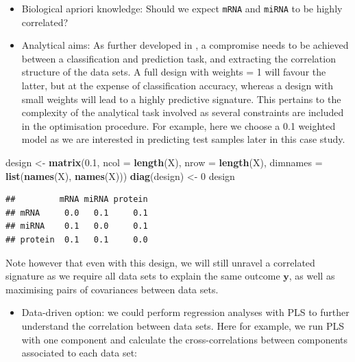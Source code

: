 \documentclass[]{book}
\newenvironment{Shaded}{\begin{snugshade}}{\end{snugshade}}
\newcommand{\DataTypeTok}[1]{\textcolor[rgb]{0.13,0.29,0.53}{#1}}
\newcommand{\DecValTok}[1]{\textcolor[rgb]{0.00,0.00,0.81}{#1}}
\newcommand{\FloatTok}[1]{\textcolor[rgb]{0.00,0.00,0.81}{#1}}
\newcommand{\KeywordTok}[1]{\textcolor[rgb]{0.13,0.29,0.53}{\textbf{#1}}}
\newcommand{\NormalTok}[1]{#1}
\newcommand{\StringTok}[1]{\textcolor[rgb]{0.31,0.60,0.02}{#1}}
\providecommand{\tightlist}{%
  \setlength{\itemsep}{0pt}\setlength{\parskip}{0pt}}
\begin{document}
\begin{itemize}
\item
  Biological apriori knowledge: Should we expect \texttt{mRNA} and \texttt{miRNA} to be highly correlated?
\item
  Analytical aims: As further developed in \citet{Sin19}, a compromise needs to be achieved between a classification and prediction task, and extracting the correlation structure of the data sets. A full design with weights = 1 will favour the latter, but at the expense of classification accuracy, whereas a design with small weights will lead to a highly predictive signature. This pertains to the complexity of the analytical task involved as several constraints are included in the optimisation procedure. For example, here we choose a 0.1 weighted model as we are interested in predicting test samples later in this case study.
\end{itemize}

\begin{Shaded}
\begin{Highlighting}[]
\NormalTok{design <-}\StringTok{ }\KeywordTok{matrix}\NormalTok{(}\FloatTok{0.1}\NormalTok{, }\DataTypeTok{ncol =} \KeywordTok{length}\NormalTok{(X), }\DataTypeTok{nrow =} \KeywordTok{length}\NormalTok{(X), }
                \DataTypeTok{dimnames =} \KeywordTok{list}\NormalTok{(}\KeywordTok{names}\NormalTok{(X), }\KeywordTok{names}\NormalTok{(X)))}
\KeywordTok{diag}\NormalTok{(design) <-}\StringTok{ }\DecValTok{0}
\NormalTok{design }
\end{Highlighting}
\end{Shaded}

\begin{verbatim}
##         mRNA miRNA protein
## mRNA     0.0   0.1     0.1
## miRNA    0.1   0.0     0.1
## protein  0.1   0.1     0.0
\end{verbatim}

Note however that even with this design, we will still unravel a correlated signature as we require all data sets to explain the same outcome \(\boldsymbol y\), as well as maximising pairs of covariances between data sets.

\begin{itemize}
\tightlist
\item
  Data-driven option: we could perform regression analyses with PLS to further understand the correlation between data sets. Here for example, we run PLS with one component and calculate the cross-correlations between components associated to each data set:
\end{itemize}
\end{document}

